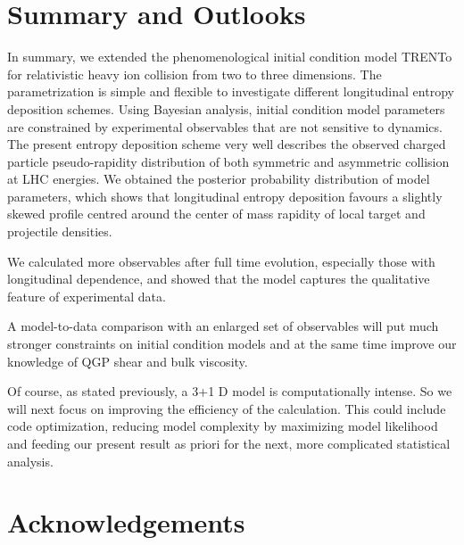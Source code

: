 \documentclass[aps,prl,twocolumn,groupedaddress]{revtex4-1}
\begin{document}
\section{Summary and Outlooks}
	In summary, we extended the phenomenological initial condition model TRENTo for relativistic heavy ion collision from two to three dimensions. 	
	The parametrization is simple and flexible to investigate different longitudinal entropy deposition schemes. 	
	Using Bayesian analysis, initial condition model parameters are constrained by experimental observables that are not sensitive to dynamics. 	
	The present entropy deposition scheme very well describes the observed charged particle pseudo-rapidity distribution of both symmetric and asymmetric collision at LHC energies.
	We obtained the posterior probability distribution of model parameters, which shows that longitudinal entropy deposition favours a slightly skewed profile centred around the center of mass rapidity of local target and projectile densities.

	We calculated more observables after full time evolution, especially those with longitudinal dependence, and showed that the model captures the qualitative feature of experimental data.

	A model-to-data comparison with an enlarged set of observables will put much stronger constraints on initial condition models and at the same time improve our knowledge of QGP shear and bulk viscosity. 

	Of course, as stated previously, a 3+1 D model is computationally intense. So we will next focus on improving the efficiency of the calculation. This could include code optimization, reducing model complexity by maximizing model likelihood and feeding our present result as priori for the next, more complicated statistical analysis.

\section{Acknowledgements}


%
\end{document}
